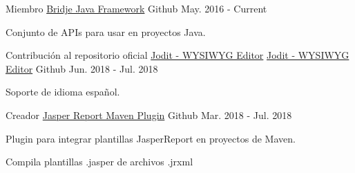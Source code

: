 
\begin{cventries}

  \cventry
    {Miembro} %
    {\href{https://github.com/touwolf/bridje-framework}{Bridje Java Framework}} %
    {\faGithubSquare\acvHeaderIconSep Github} %
    {May. 2016 - Current} %
    {
      \begin{cvitems} %
        \item {Conjunto de APIs para usar en proyectos Java.}
      \end{cvitems}
    }

  \cventry
    {Contribución al repositorio oficial \href{https://github.com/xdan/jodit}{Jodit - WYSIWYG Editor}} %
    {\href{https://github.com/miche-atucha/jodit}{Jodit - WYSIWYG Editor}} %
    {\faGithubSquare\acvHeaderIconSep Github} %
    {Jun. 2018 - Jul. 2018} %
    {
      \begin{cvitems} %
        \item {Soporte de idioma español.}
      \end{cvitems}
    }

  \cventry
    {Creador} %
    {\href{https://github.com/miche-atucha/jasperreport-maven-plugin}{Jasper Report Maven Plugin}} %
    {\faGithubSquare\acvHeaderIconSep Github} %
    {Mar. 2018 - Jul. 2018} %
    {
      \begin{cvitems} %
        \item {Plugin para integrar plantillas JasperReport en proyectos de Maven.}
        \item {Compila plantillas .jasper de archivos .jrxml}
      \end{cvitems}
    }


\end{cventries}
